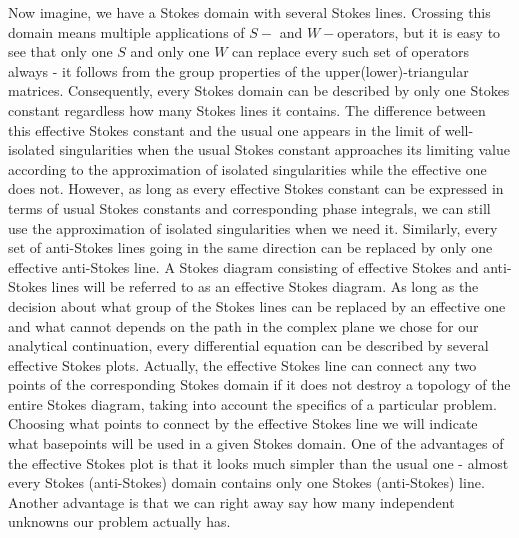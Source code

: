 \documentclass[aps,prl,preprint,superscriptaddress]{revtex4}
\begin{document}
Now imagine, we have a Stokes domain with several Stokes lines. Crossing this domain means multiple applications of $S-$ and $W-$operators, but it is easy to see that only one $S$ and only one $W$ can replace every such set of operators always - it follows from the group properties of the upper(lower)-triangular matrices. Consequently, every Stokes domain can be described by only one Stokes constant regardless how many Stokes lines it contains. The difference between this effective Stokes constant and the usual one appears in the limit of well-isolated singularities when the usual Stokes constant approaches its limiting value according to the approximation of isolated singularities while the effective one does not. However, as long as every effective Stokes constant can be expressed in terms of usual Stokes constants and corresponding phase integrals, we can still use the approximation of isolated singularities when we need it. Similarly, every set of anti-Stokes lines going in the same direction can be replaced by only one effective anti-Stokes line. A Stokes diagram consisting of effective Stokes and anti-Stokes lines will be referred to as an effective Stokes diagram. As long as the decision about what group of the Stokes lines can be replaced by an effective one and what cannot depends on the path in the complex plane we chose for our analytical continuation, every differential equation can be described by several effective Stokes plots. Actually, the effective Stokes line can connect any two points of the corresponding Stokes domain if it does not destroy a topology of the entire Stokes diagram, taking into account the specifics of a particular problem. Choosing what points to connect by the effective Stokes line we will indicate what basepoints will be used in a given Stokes domain. One of the advantages of the effective Stokes plot is that it looks much simpler than the usual one - almost every Stokes (anti-Stokes) domain contains only one Stokes (anti-Stokes) line. Another advantage is that we can right away say how many independent unknowns our problem actually has. 
\end{document}

